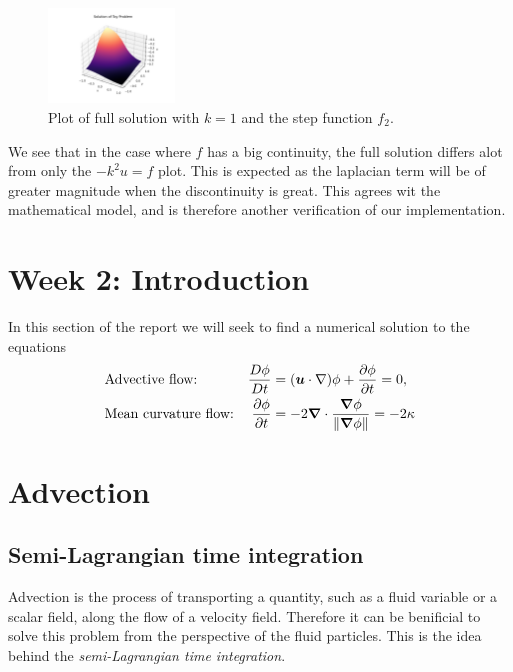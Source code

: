 \documentclass[acmtog]{acmart}
\begin{document}
\begin{figure}[H]
  \centering
  \includegraphics[width=0.3\textwidth]{Images/exp1_step_full.png}
  \caption{Plot of full solution with $k=1$ and the step function $f_2$.~\label{fig:exp1_step_full}}
\end{figure}

We see that in the case where $f$ has a big continuity, the full solution
differs alot from only the $-k^2 u = f$ plot. This is expected as the laplacian
term will be of greater magnitude when the discontinuity is great. This agrees
wit the mathematical model, and is therefore another verification of our
implementation.

\newpage
\section*{Week 2: Introduction}

In this section of the report we will seek to find a numerical solution to the
equations
\begin{align}
   & \text{Advective flow:}      & \frac{D \phi}{Dt} & = (\boldsymbol u \cdot \nabla) \phi + \frac{\partial \phi}{\partial t} = 0,
  \label{eq:advection}                                                                                                                                                              \\
   & \text{Mean curvature flow:} & \pdv{\phi}{t}     & = -2 \boldsymbol \nabla \cdot \frac{\boldsymbol \nabla \phi}{\left\lVert \boldsymbol \nabla \phi \right\rVert } = - 2 \kappa
  \label{eq:mean_curvature}
\end{align}

\section{Advection}
\subsection{Semi-Lagrangian time integration}
Advection is the process of transporting a quantity, such as a fluid variable
or a scalar field, along the flow of a velocity field. Therefore it can be
benificial to solve this problem from the perspective of the fluid particles.
This is the idea behind the \textit{semi-Lagrangian time integration}.
\end{document}
